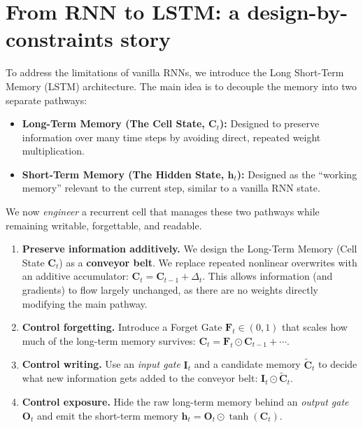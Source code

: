 \documentclass{article}
\begin{document}
\bigskip

% 

\section{From RNN to LSTM: a design-by-constraints story}

To address the limitations of vanilla RNNs, we introduce the Long Short-Term Memory (LSTM) architecture. The main idea is to decouple the memory into two separate pathways:
\begin{itemize}
    \item \textbf{Long-Term Memory (The Cell State, $\mathbf{C}_t$):} Designed to preserve information over many time steps by avoiding direct, repeated weight multiplication.
    \item \textbf{Short-Term Memory (The Hidden State, $\mathbf{h}_t$):} Designed as the ``working memory'' relevant to the current step, similar to a vanilla RNN state.
\end{itemize}

We now \emph{engineer} a recurrent cell that manages these two pathways while remaining writable, forgettable, and readable.

\begin{enumerate}
    \item \textbf{Preserve information additively.} We design the Long-Term Memory (Cell State $\mathbf{C}_t$) as a \textbf{conveyor belt}. We replace repeated nonlinear overwrites with an additive accumulator:
    $\mathbf{C}_t=\mathbf{C}_{t-1}+\Delta_t$. This allows information (and gradients) to flow largely unchanged, as there are no weights directly modifying the main pathway.
    
    \item \textbf{Control forgetting.} Introduce a Forget Gate $\mathbf{F}_t\in(0,1)$ that scales how much of the long-term memory survives: $\mathbf{C}_t=\mathbf{F}_t\odot\mathbf{C}_{t-1}+\cdots$.
    
    \item \textbf{Control writing.} Use an \emph{input gate} $\mathbf{I}_t$ and a candidate memory $\tilde{\mathbf{C}}_t$ to decide what new information gets added to the conveyor belt: $\mathbf{I}_t\odot\tilde{\mathbf{C}}_t$.
    
    \item \textbf{Control exposure.} Hide the raw long-term memory behind an \emph{output gate} $\mathbf{O}_t$ and emit the short-term memory $\mathbf{h}_t = \mathbf{O}_t\odot\tanh(\mathbf{C}_t)$.
\end{enumerate}
\end{document}
